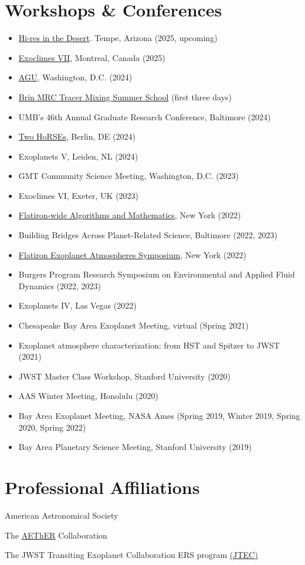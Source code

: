 \documentclass[letterpaper,10.5pt]{article}
\newcommand{\resumeItem}[2]{
  \item\small{
    \textbf{#1}{#2 \vspace{-2pt}}
  }
}
\newcommand{\resumeSubHeadingListStart}{\begin{itemize}[leftmargin=*]}
\newcommand{\resumeItemListStart}{\begin{itemize}}
\newcommand{\resumeItemListEnd}{\end{itemize}\vspace{-5pt}}
\newcommand{\shorterSection}[1]{\vspace{-10pt}\section{#1}}
\begin{document}
\shorterSection{Workshops \& Conferences}
\resumeItemListStart
\resumeItem{}{\href{https://sites.google.com/asu.edu/hi-res-in-the-desert}{Hi-res in the Desert}. Tempe, Arizona (2025, upcoming)}
\resumeItem{}{\href{https://exoclimes.org/}{Exoclimes VII}, Montreal, Canada (2025)}
\resumeItem{}{\href{https://www.agu.org/annual-meeting-2024}{AGU}, Washington, D.C. (2024)}
\resumeItem{}{\href{https://brinmrc.umd.edu/programs/schools/summer24/summer24-school-mixing.html}{Brin MRC Tracer Mixing Summer School} (first three days)}
\resumeItem{}{UMB's 46th Annual Graduate Research Conference, Baltimore (2024)}
\resumeItem{}{\href{https://sites.google.com/view/two-horses/}{Two HoRSEs}, Berlin, DE (2024)}
\resumeItem{}{Exoplanets V, Leiden, NL (2024)}
\resumeItem{}{GMT Community Science Meeting, Washington, D.C. (2023)}
\resumeItem{}{Exoclimes VI, Exeter, UK (2023)}
\resumeItem{}{\href{https://www.simonsfoundation.org/event/2022-flatiron-wide-algorithms-and-mathematics/}{Flatiron-wide Algorithms and Mathematics}, New York (2022)}
\resumeItem{}{Building Bridges Across Planet-Related Science, Baltimore (2022, 2023)}
\resumeItem{}{\href{https://www.simonsfoundation.org/event/flatiron-exoplanet-atmospheres-symposium/}{Flatiron Exoplanet Atmospheres Symposium}, New York (2022)}
\resumeItem{}{Burgers Program Research
Symposium on Environmental and Applied Fluid Dynamics (2022, 2023)}
\resumeItem{}{Exoplanets IV, Las Vegas (2022)}
\resumeItem{}{Chesapeake Bay Area Exoplanet Meeting, virtual (Spring 2021)}
\resumeItem{}{Exoplanet atmosphere characterization: from HST and Spitzer to JWST (2021)}
\resumeItem{}{JWST Master Class Workshop, Stanford University (2020)}
\resumeItem{}{AAS Winter Meeting, Honolulu (2020)}
\resumeItem{}{Bay Area Exoplanet Meeting, NASA Ames (Spring 2019, Winter 2019, Spring 2020, Spring 2022)}
\resumeItem{}{Bay Area Planetary Science Meeting, Stanford University (2019)}
\resumeItemListEnd

\shorterSection{Professional Affiliations}
\small
  \begin{list}{}{\cvlist}
  \item[{\color{numcolor}}]American Astronomical Society
  \item[{\color{numcolor}}]The \href{https://planets.carnegiescience.edu/}{AEThER} Collaboration
  \item[{\color{numcolor}}]The JWST Transiting Exoplanet Collaboration ERS program \href{https://ers-transit.github.io/}{(JTEC)}



  \end{list}
\end{document}
